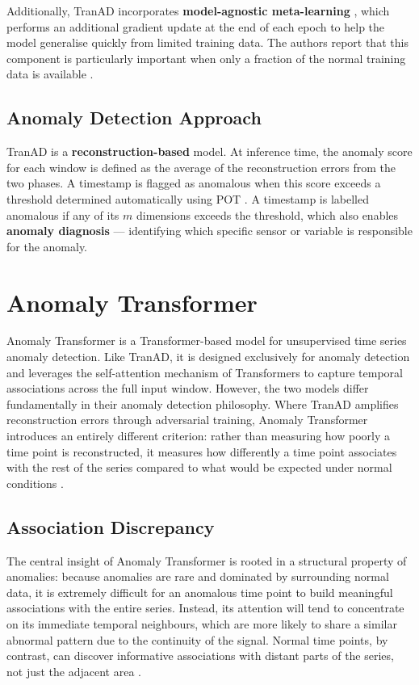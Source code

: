 \documentclass[twoside,11pt,openright]{report}
\begin{document}
Additionally, TranAD incorporates \textbf{model-agnostic meta-learning}
\citep{finn2017maml}, which performs an additional gradient update at the end of each
epoch to help the model generalise quickly from limited training data. The authors
report that this component is particularly important when only a fraction of the
normal training data is available \citep{tranad2022}.

\subsection{Anomaly Detection Approach}

TranAD is a \textbf{reconstruction-based} model. At inference time, the anomaly
score for each window is defined as the average of the reconstruction errors from
the two phases. A timestamp is flagged as anomalous when this score exceeds a
threshold determined automatically using POT
\citep{siffer2017pot}. A timestamp is labelled anomalous if any of its $m$ dimensions
exceeds the threshold, which also enables \textbf{anomaly diagnosis} --- identifying
which specific sensor or variable is responsible for the anomaly.



\section{Anomaly Transformer}

Anomaly Transformer \citep{anomalytransformer2022} is a Transformer-based model for
unsupervised time series anomaly detection. Like TranAD, it is designed exclusively
for anomaly detection and leverages the self-attention mechanism of Transformers to
capture temporal associations across the full input window. However, the two models
differ fundamentally in their anomaly detection philosophy. Where TranAD amplifies
reconstruction errors through adversarial training, Anomaly Transformer introduces an
entirely different criterion: rather than measuring how poorly a time point is
reconstructed, it measures how differently a time point associates with the rest of
the series compared to what would be expected under normal conditions
\citep{anomalytransformer2022}.

\subsection{Association Discrepancy}

The central insight of Anomaly Transformer is rooted in a structural property of
anomalies: because anomalies are rare and dominated by surrounding normal data, it is
extremely difficult for an anomalous time point to build meaningful associations with
the entire series. Instead, its attention will tend to concentrate on its immediate
temporal neighbours, which are more likely to share a similar abnormal pattern due to
the continuity of the signal. Normal time points, by contrast, can discover informative
associations with distant parts of the series, not just the adjacent area
\citep{anomalytransformer2022}.
\end{document}
